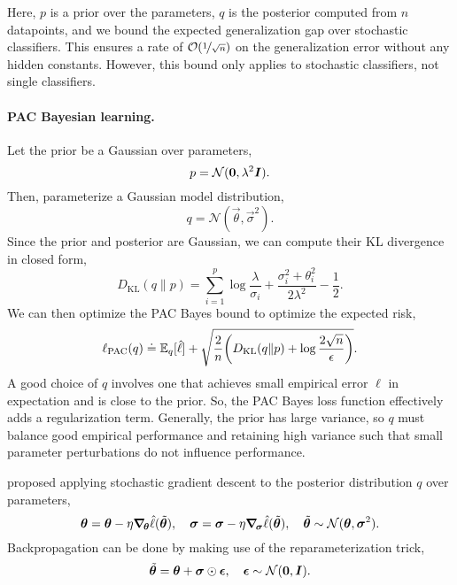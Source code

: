 Here, $p$ is a prior over the parameters, $q$ is the posterior computed from $n$ datapoints, and we
bound the expected generalization gap over stochastic classifiers. This ensures a rate of
$\bigo{\nicefrac{1}{\sqrt{n}}}$ on the generalization error without any hidden constants. However,
this bound only applies to stochastic classifiers, not single classifiers.

\paragraph{PAC Bayesian learning.}

Let the prior be a Gaussian over parameters, \[
    p = \mathcal{N}(\bm{0}, \lambda^2 \bm{I}).
\]
Then, parameterize a Gaussian model distribution, \[
    q = \mathcal{N}(\vec{\theta}, \vec{\sigma}^2).
\]
Since the prior and posterior are Gaussian, we can compute their KL divergence in closed form, \[
    D_{\mathrm{KL}}(q \| p) = \sum_{i=1}^{p} \log \frac{\lambda}{\sigma_i} + \frac{\sigma_i^2 + \theta_i^2}{2 \lambda^2} - \frac{1}{2}.
\]
We can then optimize the PAC Bayes bound to optimize the expected risk, \[
    \ell_{\mathrm{PAC}}(q) \doteq \E_q[\hat{\ell}] + \sqrt{\frac{2}{n} \lft( D_{\mathrm{KL}}(q \| p) + \log \frac{2 \sqrt{n}}{\epsilon} \rgt)}.
\]
A good choice of $q$ involves one that achieves small empirical error $\hat{\ell}$ in expectation
and is close to the prior. So, the PAC Bayes loss function effectively adds a regularization term.
Generally, the prior has large variance, so $q$ must balance good empirical performance and
retaining high variance such that small parameter perturbations do not influence performance.

\citet{dziugaite2017computing} proposed applying stochastic gradient descent to the posterior distribution $q$ over parameters, \[
    \bm{\theta} = \bm{\theta} - \eta \bm{\nabla}_{\! \bm{\theta}} \hat{\ell}(\tilde{\bm{\theta}}), \quad \bm{\sigma} = \bm{\sigma} - \eta \bm{\nabla}_{\! \bm{\sigma}} \hat{\ell}(\tilde{\bm{\theta}}), \quad \tilde{\bm{\theta}} \sim \mathcal{N}(\bm{\theta}, \bm{\sigma}^2).
\]
Backpropagation can be done by making use of the reparameterization trick, \[
    \tilde{\bm{\theta}} = \bm{\theta} + \bm{\sigma} \odot \bm{\epsilon}, \quad \bm{\epsilon} \sim \mathcal{N}(\bm{0}, \bm{I}).
\]

